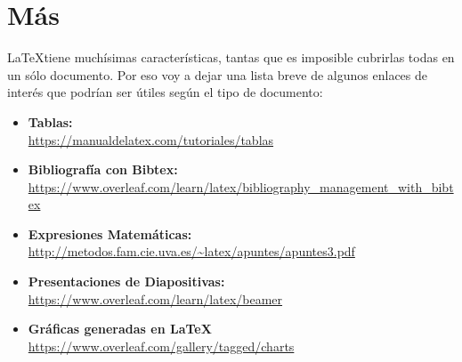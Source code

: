 \documentclass{report}
\begin{document}
\section{Más}
\LaTeX tiene muchísimas características, tantas que es imposible cubrirlas todas en un sólo documento. Por eso voy a dejar una lista breve de algunos enlaces de interés que podrían ser útiles según el tipo de documento:

\begin{itemize}
    \item \textbf{Tablas:} \\
    \url{https://manualdelatex.com/tutoriales/tablas}
    
    \item \textbf{Bibliografía con Bibtex:}\\
    \url{https://www.overleaf.com/learn/latex/bibliography_management_with_bibtex}
    
    \item \textbf{Expresiones Matemáticas:}\\
    \url{http://metodos.fam.cie.uva.es/~latex/apuntes/apuntes3.pdf}
    
    \item \textbf{Presentaciones de Diapositivas:}\\
    \url{https://www.overleaf.com/learn/latex/beamer}
    
    \item \textbf{Gráficas generadas en \LaTeX}\\
    \url{https://www.overleaf.com/gallery/tagged/charts}    
\end{itemize}



%

\end{document}
